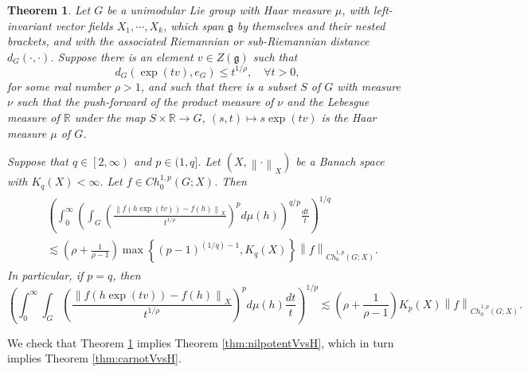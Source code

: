 \documentclass[11pt,reqno]{amsart}
\newtheorem{theorem}{Theorem}
\newcommand{\1}{\mathbf 1}
\begin{document}
\begin{theorem}\label{thm:cvx}
Let $G$ be a unimodular Lie group with Haar measure $\mu$, with left-invariant vector fields $X_1,\cdots,X_k$, which span $\mathfrak{g}$ by themselves and their nested brackets, and with the associated Riemannian or sub-Riemannian distance $d_G\left(\cdot,\cdot\right)$. Suppose there is an element $v\in Z\left(\mathfrak{g}\right)$ such that
\begin{equation}\label{eq:rho-ineq}
d_G\left(\exp\left(tv\right),e_G\right)\le t^{1/\rho}, \quad \forall t>0,
\end{equation}
for some real number $\rho>1$, and such that there is a subset $S$ of $G$ with measure $\nu$ such that the push-forward of the product measure of $\nu$ and the Lebesgue measure of $\mathbb{R}$ under the map $S\times \mathbb{R}\to G$, $\left(s,t\right)\mapsto s\exp\left(tv\right)$ is the Haar measure $\mu$ of $G$.

Suppose that $q\in \left[2,\infty\right)$ and $p\in (1,q]$. Let $\left(X,\left\|\cdot\right\|_X\right)$ be a Banach space with $K_q\left(X\right)<\infty$. Let $f\in Ch_0^{1,p}\left(G;X\right)$. Then
\begin{align}\label{eq:continuous main p<q}
\begin{aligned}
&\left(\int_0^\infty \left(\int_{G}\left(\frac{\left\|f\left(h\exp\left(tv\right)\right)-f\left(h\right)\right\|_X}{t^{1/\rho}}\right)^pd\mu\left(h\right)\right)^{q/p}\frac{dt}{t}\right)^{1/q}\\
&\lesssim \left(\rho+\frac{1}{\rho-1}\right)\max\left\{\left(p-1\right)^{(1/q)-1},K_q\left(X\right)\right\} \left\|f\right\|_{\dot{Ch}_0^{1,p}\left(G;X\right)}.
\end{aligned}
\end{align}
In particular, if $p= q$, then
\begin{equation}\label{eq:continuous main}
\left(\int_0^\infty \int_{G}\left(\frac{\left\|f\left(h\exp\left(tv\right)\right)-f\left(h\right)\right\|_X}{t^{1/\rho}}\right)^pd\mu\left(h\right)\frac{dt}{t}\right)^{1/p}
\lesssim \left(\rho+\frac{1}{\rho-1}\right)K_p\left(X\right) \left\|f\right\|_{\dot{Ch}_0^{1,p}\left(G;X\right)}.
\end{equation}
\end{theorem}



We check that Theorem \ref{thm:cvx} implies Theorem \ref{thm:nilpotentVvsH}, which in turn implies Theorem \ref{thm:carnotVvsH}.
\end{document}
